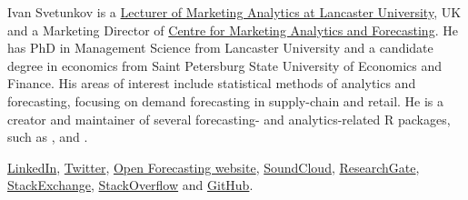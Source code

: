 \documentclass[
]{book}
\theoremstyle{definition}
\theoremstyle{definition}
\theoremstyle{definition}
\theoremstyle{definition}
\theoremstyle{remark}
\begin{document}
Ivan Svetunkov is a \href{https://www.lancaster.ac.uk/lums/people/ivan-svetunkov}{Lecturer of Marketing Analytics at Lancaster University}, UK and a Marketing Director of \href{https://www.lancaster.ac.uk/lums/cmaf/}{Centre for Marketing Analytics and Forecasting}. He has PhD in Management Science from Lancaster University and a candidate degree in economics from Saint Petersburg State University of Economics and Finance. His areas of interest include statistical methods of analytics and forecasting, focusing on demand forecasting in supply-chain and retail. He is a creator and maintainer of several forecasting- and analytics-related R packages, such as \citet{R-greybox}, \citet{R-smooth} and \citet{R-legion}.

\href{https://www.linkedin.com/in/isvetunkov/}{LinkedIn}, \href{https://twitter.com/iSvetunkov}{Twitter}, \href{https://forecasting.svetunkov.ru/}{Open Forecasting website}, \href{https://soundcloud.com/ivan-svetunkov}{SoundCloud}, \href{https://www.researchgate.net/profile/Ivan_Svetunkov}{ResearchGate}, \href{http://stats.stackexchange.com/users/87585/ivan-svetunkov}{StackExchange}, \href{http://stackoverflow.com/users/5296618/ivan-svetunkov}{StackOverflow} and \href{https://github.com/config-i1}{GitHub}.

  
\end{document}
